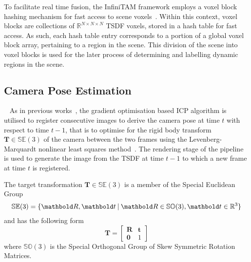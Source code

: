 To facilitate real time fusion, the InfiniTAM framework employs a voxel block
hashing mechanism for fast access to scene voxels~\cite{NieBner2013}. Within
this context, voxel blocks are collections of \(\mathbb{R}^{N \times N \times N}\) 
TSDF voxels, stored in a hash table for fast access. As such, each hash table entry 
corresponds to a portion of a global voxel block array, pertaining to a region in the 
scene. This division of the scene into voxel blocks is used for the later process of 
determining and labelling dynamic regions in the scene.

\subsection{Camera Pose Estimation}
~\label{subsec:moseg_static_camera_tracking}
As in previous works~\cite{Newcombe2011, Prisacariu2014}, the gradient
optimisation based ICP algorithm is utilised to register consecutive images
to derive the camera pose at time \(t\) with respect to time \(t-1\), that is to
optimise for the rigid body transform \(\bm{T} \in \mathbb{SE}(3)\) of the
camera between the two frames using the Levenberg-Marquardt nonlinear least
squares method~\cite{NumericalRecipes}. The rendering stage of the pipeline
is used to generate the image from the TSDF at time \(t-1\) to which a new frame
at time \(t\) is registered.

The target transformation \(\bm{T} \in \mathbb{SE}(3)\) is a member of the
Special Euclidean Group
\begin{equation}
  \label{eqn:se3_definition}
  \mathbb{SE}(3) = \{\bm{R}, \bm{t} \given \bm{R} \in
  \mathbb{SO}(3), \bm{t} \in \mathbb{R}^{3}\}
\end{equation}
and has the following form
\begin{equation}
  \label{eqn:trans_mat_definition}
  \bm{T} =
  \begin{bmatrix}
    \bm{R} & \bm{t} \\
    \bm{0} & 1
  \end{bmatrix}
\end{equation}
where \(\mathbb{SO}(3)\) is the Special Orthogonal Group of Skew Symmetric
Rotation Matrices.

